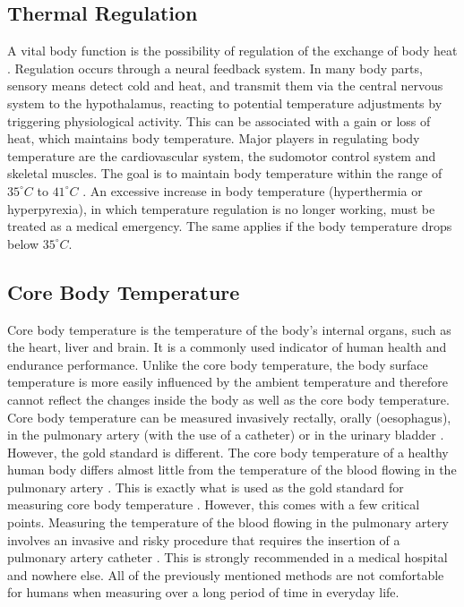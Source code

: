 \subsection{Thermal Regulation}
\label{Background:BodyTemperature:ThermalRegulation}
A vital body function is the possibility of regulation of the exchange of body heat \cite{grodzinskyUnderstandingFeverBody2020}.
Regulation occurs through a neural feedback system. 
In many body parts, sensory means detect cold and heat, and transmit them via the central nervous system to the hypothalamus, reacting to potential temperature adjustments by triggering physiological activity. 
This can be associated with a gain or loss of heat, which maintains body temperature.
Major players in regulating body temperature are the cardiovascular system, the sudomotor control system and skeletal muscles. 
The goal is to maintain body temperature within the range of $35^\circ C$ to $41^\circ C$ \cite{pierauTemperatursensibilitaet2001}. 
An excessive increase in body temperature (hyperthermia or hyperpyrexia), in which temperature regulation is no longer working, must be treated as a medical emergency.
The same applies if the body temperature drops below $35^\circ C$.

\subsection{Core Body Temperature}
\label{Background:BodyTemperature:CBT}
Core body temperature is the temperature of the body's internal organs, such as the heart, liver and brain. 
It is a commonly used indicator of human health and endurance performance.
Unlike the core body temperature, the body surface temperature is more easily influenced by the ambient temperature and therefore cannot reflect the changes inside the body as well as the core body temperature.
Core body temperature can be measured invasively rectally, orally (oesophagus), in the pulmonary artery (with the use of a catheter) or in the urinary bladder \cite{moranCoreTemperatureMeasurement2002a}.
However, the gold standard is different.
The core body temperature of a healthy human body differs almost little from the temperature of the blood flowing in the pulmonary artery \cite{krizanacFemoroiliacalArteryPulmonary2013, holtzclawMonitoringBodyTemperature1993}.
This is exactly what is used as the gold standard for measuring core body temperature \cite{krizanacFemoroiliacalArteryPulmonary2013, holtzclawMonitoringBodyTemperature1993, fulbrookCoreBodyTemperature1997, maxtonEstimatingCoreTemperature2004}.
However, this comes with a few critical points.
Measuring the temperature of the blood flowing in the pulmonary artery involves an invasive and risky procedure that requires the insertion of a pulmonary artery catheter \cite{yeohRevisitingTympanicMembrane2017}.
This is strongly recommended in a medical hospital and nowhere else.
All of the previously mentioned methods are not comfortable for humans when measuring over a long period of time in everyday life.

